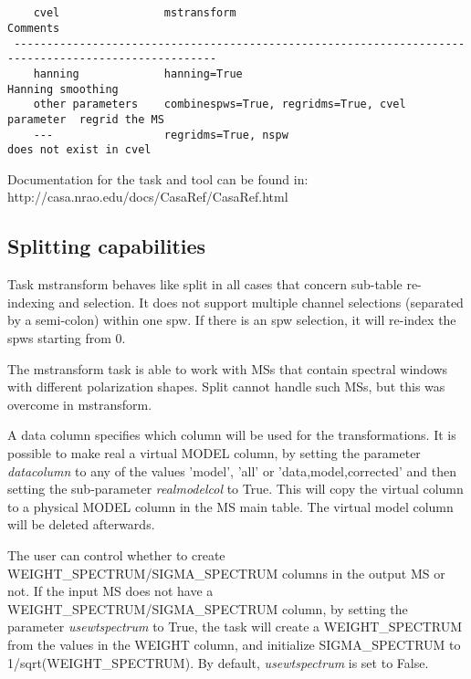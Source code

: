 \begin{verbatim}


    cvel                mstransform                                      Comments
 -----------------------------------------------------------------------------------------------------
    hanning             hanning=True                                     Hanning smoothing
    other parameters    combinespws=True, regridms=True, cvel parameter  regrid the MS
    ---                 regridms=True, nspw                              does not exist in cvel

\end{verbatim}


Documentation for the task and tool can be found in:
 {http://casa.nrao.edu/docs/CasaRef/CasaRef.html}

\subsection{Splitting capabilities}
Task mstransform behaves like split in all cases that concern sub-table re-indexing
and selection. It does not support multiple channel selections (separated by a
semi-colon) within one spw. If there is an spw selection, it will re-index the
spws starting from 0.

The mstransform task is able to work with MSs that contain spectral windows with 
different polarization shapes. Split cannot handle such MSs, but this was overcome 
in mstransform.

A data column specifies which column will be used for the transformations. It is
possible to make real a virtual MODEL column, by setting the parameter
{\it datacolumn} to any of the values 'model', 'all' or 'data,model,corrected'
and then setting the sub-parameter {\it realmodelcol} to True. This will copy the virtual
column to a physical MODEL column in the MS main table. The virtual model column
will be deleted afterwards.

The user can control whether to create WEIGHT\_SPECTRUM/SIGMA\_SPECTRUM columns
in the output MS or not. If the input MS does not have a
WEIGHT\_SPECTRUM/SIGMA\_SPECTRUM column, by setting the parameter {\it
usewtspectrum} to True, the task will create a WEIGHT\_SPECTRUM from the values
in the WEIGHT column, and initialize SIGMA\_SPECTRUM to 1/sqrt(WEIGHT\_SPECTRUM). 
By default, {\it usewtspectrum} is set to False.

